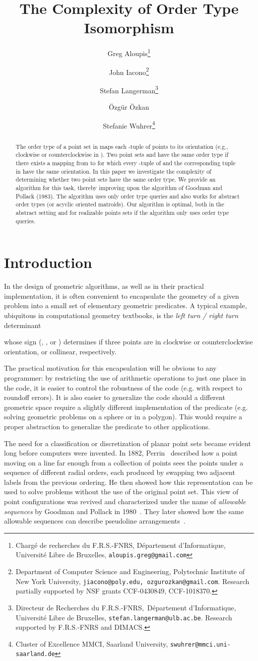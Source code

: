 \documentclass[leqno,12pt]{article}
\title{The Complexity of Order Type Isomorphism}
\date{}
\author{Greg Aloupis\thanks{Charg\'e de recherches du F.R.S.-FNRS,
    D\'{e}partement d'Informatique, Universit\'{e} Libre de Bruxelles, 
{\tt aloupis.greg@gmail.com}}
 \and 
 John Iacono\thanks{Department of Computer Science and Engineering, Polytechnic Institute of New York University, {\tt jiacono@poly.edu, ozgurozkan@gmail.com}. Research partially supported by NSF grants CCF-0430849,  CCF-1018370.}
  \and 
 Stefan Langerman\thanks{Directeur de Recherches du
   F.R.S.-FNRS,~D\'{e}partement d'Informatique, Universit\'{e} Libre de Bruxelles,
   {\tt stefan.langerman@ulb.ac.be}. Research supported by F.R.S.-FNRS
 and DIMACS.}
  \and
   \"{O}zg\"{u}r \"{O}zkan\footnotemark[2]
 \and 
    Stefanie Wuhrer\thanks{Cluster of Excellence MMCI, Saarland University,
   {\tt swuhrer@mmci.uni-saarland.de} }}
\begin{document}
\maketitle


\begin{abstract}\small\baselineskip=9pt 
The order type of a point set in  maps each -tuple of points
to its orientation (e.g., clockwise or counterclockwise in ). 
Two point sets  and  have the same order type if there
exists a mapping  from  to  for which every -tuple 
 of  and the corresponding
tuple  in  have the same orientation.
In this paper we investigate the complexity of determining whether two
point sets have the same order type.
We provide an  algorithm for this task, thereby improving upon
the  algorithm of Goodman and Pollack (1983). The
algorithm uses only order type queries and also works for abstract
order types (or acyclic oriented matroids).
Our algorithm is optimal, both in the abstract setting and for
realizable points sets if the algorithm only uses order type queries.
\end{abstract}






\section{Introduction}
In the design of geometric algorithms, as well as in their practical
implementation, it is often convenient to encapsulate the geometry of
a given
problem into a small set of elementary geometric predicates. A typical
example, ubiquitous in computational geometry textbooks, is the \emph{left
turn / right turn} determinant

whose sign (, , or ) determines if three points 
are in clockwise or counterclockwise orientation, or collinear, respectively.

The practical motivation for this encapsulation will be obvious to any
programmer: by restricting the use of arithmetic operations to just
one place in the code, it is easier to control the robustness of the
code (e.g. with respect to roundoff errors). It is also easier to
generalize the code should a different geometric space require a
slightly different implementation of the predicate (e.g. solving 
geometric problems on a sphere or in a polygon). This
would require a proper abstraction to generalize the predicate
 to other applications.

The need for a classification or discretization of planar point sets
became evident long before computers were invented. 
In 1882,
Perrin~\cite{Perrin1882} described how a point moving on a line far enough from a
collection of points sees the points under a sequence of 
different radial orders, each produced by swapping two adjacent labels
from the previous ordering. He then showed how this representation
can be used to solve problems without the use of the original
point set. This view of point configurations was revived and
characterized under the name of \emph{allowable sequences} 
by Goodman and Pollack in 1980~\cite{Goodman1980220}. They later showed how the same
allowable sequences can describe pseudoline arrangements~\cite{Goodman1984257}.
\end{document}
